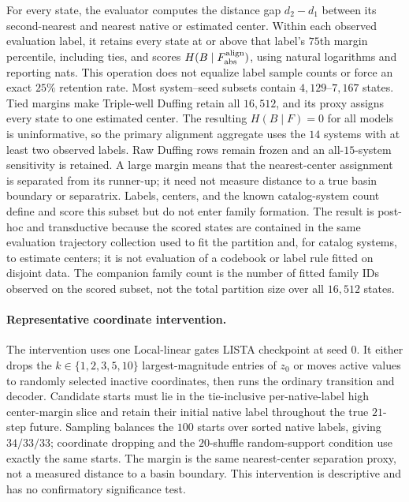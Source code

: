 For every state, the evaluator computes the distance gap \(d_2-d_1\) between its second-nearest and nearest native or estimated center. Within each observed evaluation label, it retains every state at or above that label's \(75\)th margin percentile, including ties, and scores \(H(B\mid F_{\rm abs}^{\rm align})\), using natural logarithms and reporting nats. This operation does not equalize label sample counts or force an exact \(25\%\) retention rate. Most system--seed subsets contain \(4{,}129\)--\(7{,}167\) states. Tied margins make Triple-well Duffing retain all \(16{,}512\), and its proxy assigns every state to one estimated center. The resulting \(H(B\mid F)=0\) for all models is uninformative, so the primary alignment aggregate uses the \(14\) systems with at least two observed labels. Raw Duffing rows remain frozen and an all-\(15\)-system sensitivity is retained. A large margin means that the nearest-center assignment is separated from its runner-up; it need not measure distance to a true basin boundary or separatrix. Labels, centers, and the known catalog-system count define and score this subset but do not enter family formation. The result is post-hoc and transductive because the scored states are contained in the same evaluation trajectory collection used to fit the partition and, for catalog systems, to estimate centers; it is not evaluation of a codebook or label rule fitted on disjoint data. The companion family count is the number of fitted family IDs observed on the scored subset, not the total partition size over all \(16{,}512\) states.

\paragraph{Representative coordinate intervention.}
The intervention uses one Local-linear gates LISTA checkpoint at seed \(0\). It either drops the \(k\in\{1,2,3,5,10\}\) largest-magnitude entries of \(z_0\) or moves active values to randomly selected inactive coordinates, then runs the ordinary transition and decoder. Candidate starts must lie in the tie-inclusive per-native-label high center-margin slice and retain their initial native label throughout the true \(21\)-step future. Sampling balances the \(100\) starts over sorted native labels, giving \(34/33/33\); coordinate dropping and the \(20\)-shuffle random-support condition use exactly the same starts. The margin is the same nearest-center separation proxy, not a measured distance to a basin boundary. This intervention is descriptive and has no confirmatory significance test.

